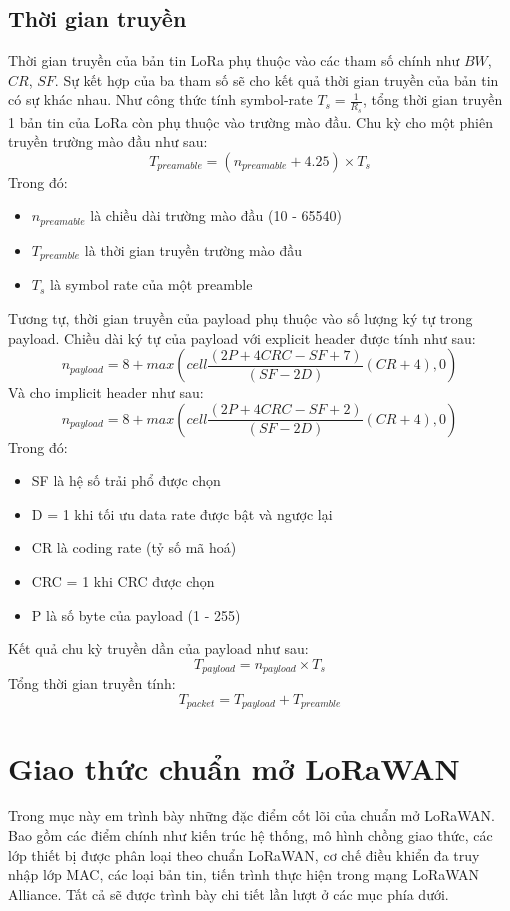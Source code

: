 \subsection{Thời gian truyền}
Thời gian truyền của bản tin LoRa phụ thuộc vào các tham số chính như $BW$, $CR$, $SF$. Sự kết hợp của ba tham số sẽ cho kết quả thời gian truyền của bản tin có sự khác nhau.
Như công thức tính symbol-rate $T_s = \frac{1}{R_s}$, tổng thời gian truyền 1 bản tin của LoRa còn phụ thuộc vào trường mào đầu. Chu kỳ cho một phiên truyền trường mào đầu như sau:
\begin{equation}
T_{preamable} = (n_{preamable} + 4.25) \times T_s
\end{equation}
Trong đó:
\begin{itemize}
\item $n_{preamable}$ là chiều dài trường mào đầu (10 - 65540)
\item $T_{preamble}$ là thời gian truyền trường mào đầu
\item $T_s$ là symbol rate của một preamble
\end{itemize}
Tương tự, thời gian truyền của payload phụ thuộc vào số lượng ký tự trong payload. Chiều dài ký tự của payload với explicit header được tính như sau:
\begin{equation}
{{n}_{payload}}=8+max(cell\frac{(2P+4CRC-SF+7)}{(SF-2D)}(CR+4),0)
\end{equation}
Và cho implicit header như sau:
\begin{equation}
{{n}_{payload}}=8+max(cell\frac{(2P+4CRC-SF+2)}{(SF-2D)}(CR+4),0)
\end{equation}
Trong đó:
\begin{itemize}
\item	SF là hệ số trải phổ được chọn
\item	D = 1 khi tối ưu data rate được bật và ngược lại
\item	CR là coding rate (tỷ số mã hoá)
\item	CRC = 1 khi CRC được chọn
\item	P là số byte của payload (1 - 255)
\end{itemize}
Kết quả chu kỳ truyền dần của payload như sau:
\begin{equation}
T_{payload} = n_{payload} \times T_s
\end{equation}
Tổng thời gian truyền tính:
\begin{equation}
T_{packet} = T_{payload} + T_{preamble}
\end{equation}

\section{Giao thức chuẩn mở LoRaWAN}
Trong mục này em trình bày những đặc điểm cốt lõi của chuẩn mở LoRaWAN. Bao gồm các điểm chính như kiến trúc hệ thống, mô hình chồng giao thức, các lớp thiết bị được phân loại theo chuẩn LoRaWAN, cơ chế điều khiển đa truy nhập lớp MAC, các loại bản tin, tiến trình thực hiện trong mạng LoRaWAN Alliance. Tất cả sẽ được trình bày chi tiết lần lượt ở các mục phía dưới.
